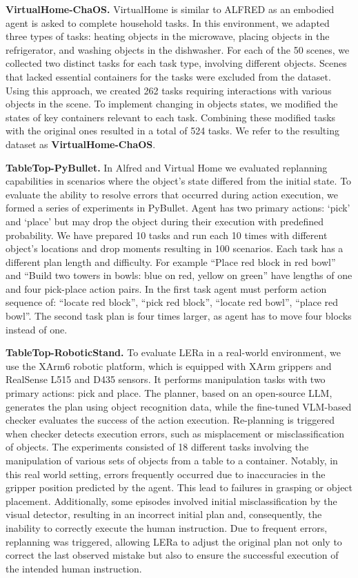 \documentclass[letterpaper, 10 pt, conference]{ieeeconf}  %
\begin{document}
\textbf{VirtualHome-ChaOS.}
VirtualHome is similar to ALFRED as an embodied agent is asked to complete household tasks.
In this environment, we adapted three types of tasks: heating objects in the microwave, placing objects in the refrigerator, and washing objects in the dishwasher. For each of the 50 scenes, we collected two distinct tasks for each task type, involving different objects. Scenes that lacked essential containers for the tasks were excluded from the dataset.
Using this approach, we created 262 tasks requiring interactions with various objects in the scene. To implement changing in objects states, we modified the states of key containers relevant to each task. Combining these modified tasks with the original ones resulted in a total of 524 tasks. We refer to the resulting dataset as \textbf{VirtualHome-ChaOS}.

\textbf{TableTop-PyBullet.}
In Alfred and Virtual Home we evaluated replanning capabilities in scenarios where the object's state differed from the initial state. To evaluate the ability to resolve errors that occurred during action execution, we formed a series of experiments in PyBullet. Agent has two primary actions: `pick' and `place' but may drop the object during their execution with predefined probability. We have prepared 10 tasks and run each 10 times with different object's locations and drop moments resulting in 100 scenarios. Each task has a different plan length and difficulty. For example ``Place red block in red bowl'' and ``Build two towers in bowls: blue on red, yellow on green'' have lengths of one and four pick-place action pairs. In the first task agent must perform action sequence of: ``locate red block'', ``pick red block'', ``locate red bowl'', ``place red bowl''. The second task plan is four times larger, as agent has to move four blocks instead of one. 

\textbf{TableTop-RoboticStand.}
To evaluate LERa in a real-world environment, we use the XArm6 robotic platform, which is equipped with XArm grippers and RealSense L515 and D435 sensors. It performs manipulation tasks with two primary actions: pick and place. The planner, based on an open-source LLM, generates the plan using object recognition data, while the fine-tuned VLM-based checker evaluates the success of the action execution. Re-planning is triggered when checker detects execution errors, such as misplacement or misclassification of objects. 
The experiments consisted of 18 different tasks involving the manipulation of various sets of objects from a table to a container. Notably, in this real world setting, errors frequently occurred due to inaccuracies in the gripper position predicted by the agent. This lead to failures in grasping or object placement. Additionally, some episodes involved initial misclassification by the visual detector, resulting in an incorrect initial plan and, consequently, the inability to correctly execute the human instruction. Due to frequent errors, replanning was triggered, allowing LERa to adjust the original plan not only to correct the last observed mistake but also to ensure the successful execution of the intended human instruction.
\end{document}
